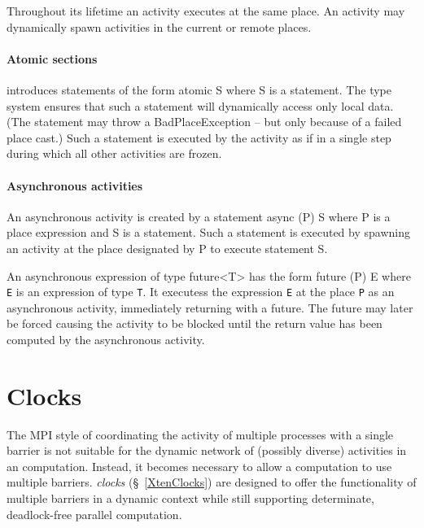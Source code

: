 Throughout its lifetime an activity executes at the same place. An
activity may dynamically spawn activities in the current or remote
places.

\paragraph{Atomic sections}

\Xten{} introduces statements of the form {\cf atomic S} where {\cf S}
is a statement.  The type system ensures that such a statement will
dynamically access only local data. (The statement may throw
a {\cf BadPlaceException} -- but only because of a failed place cast.)
Such a statement is executed by the activity as if in a single step
during which all other activities are frozen.

\paragraph{Asynchronous activities}

An asynchronous activity is created by a statement {\cf async (P) S}
where {\cf P} is a place expression and {\cf S} is a statement.  Such
a statement is executed by spawning an activity at the place
designated by {\cf P} to execute statement {\cf S}.

An asynchronous expression of type {\cf future<T>} has the form {\cf
future (P) E} where {\tt E} is an expression of type {\tt T}. It
executess the expression {\tt E} at the place {\tt P} as an
asynchronous activity, immediately returning with a future. The future
may later be forced causing the activity to be blocked until the
return value has been computed by the asynchronous activity.

\section{Clocks}
The MPI style of coordinating the activity of multiple processes with
a single barrier is not suitable for the dynamic network of (possibly
diverse) activities in an \Xten{} computation. Instead, it becomes
necessary to allow a computation to use multiple barriers. \Xten{}
{\em clocks} (\S~\ref{XtenClocks}) are designed to offer the
functionality of multiple barriers in a dynamic context while still
supporting determinate, deadlock-free parallel computation.

